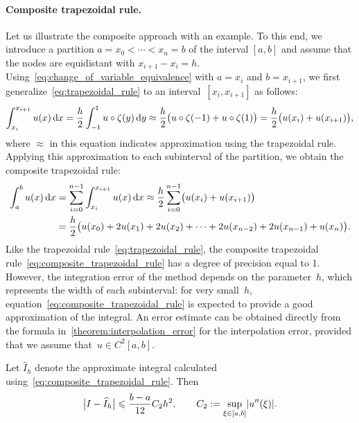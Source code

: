 \paragraph{Composite trapezoidal rule.}
Let us illustrate the composite approach with an example.
To this end,
we introduce a partition $a = x_0 < \dotsb < x_n = b$ of the interval $[a, b]$ and
assume that the nodes are equidistant with $x_{i+1} - x_i = h$.
Using~\eqref{eq:change_of_variable_equivalence} with $a = x_i$ and $b = x_{i+1}$,
we first generalize~\eqref{eq:trapezoidal_rule} to an interval~$[x_i, x_{i+1}]$ as follows:
\[
    \int_{x_i}^{x_{i+1}} u(x) \, \mathrm d x
    = \frac{h}{2} \int_{-1}^{1} u \circ \zeta (y) \, \mathrm d y
    \approx \frac{h}{2} \bigl( u \circ \zeta(-1)  + u \circ \zeta(1) \bigr)
    = \frac{h}{2} \bigl(u(x_i) + u(x_{i+1})\bigr),
\]
where $\approx$ in this equation indicates approximation using the trapezoidal rule.
Applying this approximation to each subinterval of the partition,
we obtain the composite trapezoidal rule:
\begin{align}
    \notag
    \int_{a}^{b} u(x) \, \mathrm d x
    &= \sum_{i=0}^{n-1} \int_{x_i}^{x_{i+1}} u(x) \, \mathrm d x
    \approx
    \frac{h}{2}\sum_{i=0}^{n-1} \bigl( u(x_i) + u(x_{i+1}) \bigr) \\
    \label{eq:composite_trapezoidal_rule}
    &= \frac{h}{2} \bigl( u(x_0) + 2 u(x_1) + 2 u(x_2) + \dotsb + 2 u(x_{n-2}) + 2 u(x_{n-1}) + u(x_n) \bigr).
\end{align}
Like the trapezoidal rule~\eqref{eq:trapezoidal_rule},
the composite trapezoidal rule~\eqref{eq:composite_trapezoidal_rule} has a degree of precision equal to 1.
However,
the integration error of the method depends on the parameter~$h$,
which represents the width of each subinterval:
for very small~$h$,
equation~\eqref{eq:composite_trapezoidal_rule} is expected to provide a good approximation of the integral.
An error estimate can be obtained directly from the formula in~\cref{theorem:interpolation_error} for the interpolation error,
provided that we assume that~$u \in C^2[a, b]$.

\begin{theorem}
    \label{theorem:integration_error_trapeze}
    Let $\widehat I_h$ denote the approximate integral calculated using~\eqref{eq:composite_trapezoidal_rule}.
    Then
    \begin{equation}
        \label{eq:error_bound_trapezoidal}
        \bigl\lvert I - \widehat I_h \bigr\rvert
        \leq \frac{b-a}{12} C_2 h^2,
        \qquad
        C_2 := \sup_{\xi \in [a, b]} \abs*{u''(\xi)}.
    \end{equation}
\end{theorem}

